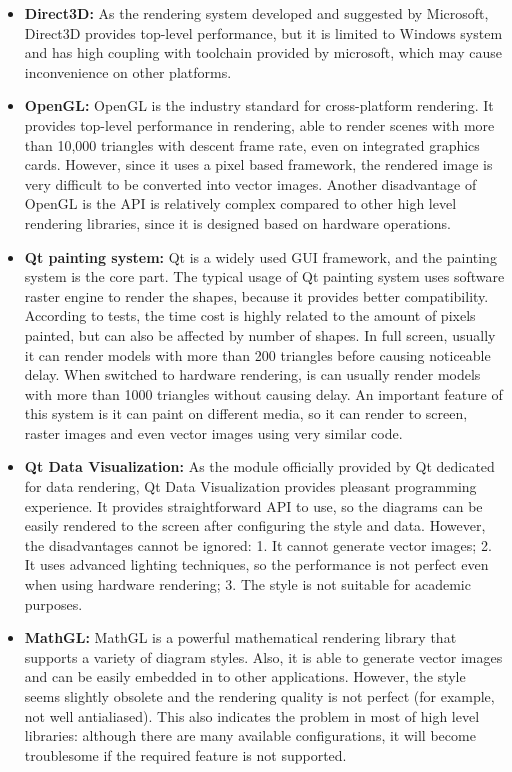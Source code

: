 \begin{itemize}
	\item \textbf{Direct3D:} As the rendering system developed and suggested by Microsoft, Direct3D provides top-level performance, but it is limited to Windows system and has high coupling with toolchain provided by microsoft, which may cause inconvenience on other platforms.

	\item \textbf{OpenGL:} OpenGL is the industry standard for cross-platform rendering. It provides top-level performance in rendering, able to render scenes with more than 10,000 triangles with descent frame rate, even on integrated graphics cards. However, since it uses a pixel based framework, the rendered image is very difficult to be converted into vector images. Another disadvantage of OpenGL is the API is relatively complex compared to other high level rendering libraries, since it is designed based on hardware operations.

	\item \textbf{Qt painting system:} Qt is a widely used GUI framework, and the painting system is the core part. The typical usage of Qt painting system uses software raster engine to render the shapes, because it provides better compatibility. According to tests, the time cost is highly related to the amount of pixels painted, but can also be affected by number of shapes. In full screen, usually it can render models with more than 200 triangles before causing noticeable delay. When switched to hardware rendering, is can usually render models with more than 1000 triangles without causing delay. An important feature of this system is it can paint on different media, so it can render to screen, raster images and even vector images using very similar code.

	\item \textbf{Qt Data Visualization:} As the module officially provided by Qt dedicated for data rendering, Qt Data Visualization provides pleasant programming experience. It provides straightforward API to use, so the diagrams can be easily rendered to the screen after configuring the style and data. However, the disadvantages cannot be ignored: 1. It cannot generate vector images; 2. It uses advanced lighting techniques, so the performance is not perfect even when using hardware rendering; 3. The style is not suitable for academic purposes.

	\item \textbf{MathGL:} MathGL is a powerful mathematical rendering library that supports a variety of diagram styles. Also, it is able to generate vector images and can be easily embedded in to other applications. However, the style seems slightly obsolete and the rendering quality is not perfect (for example, not well antialiased). This also indicates the problem in most of high level libraries: although there are many available configurations, it will become troublesome if the required feature is not supported.
\end{itemize}

